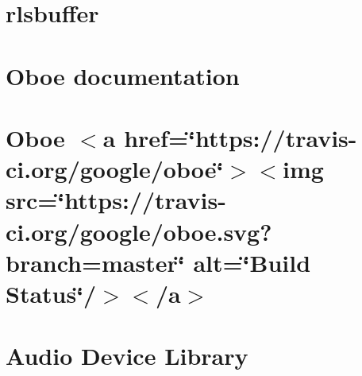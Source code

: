 \let\mypdfximage\pdfximage\def\pdfximage{\immediate\mypdfximage}\documentclass[twoside]{book}
\newcommand{\+}{\discretionary{\mbox{\scriptsize$\hookleftarrow$}}{}{}}
\begin{document}
\chapter{rlsbuffer}
\label{md__c_1__users_fab_src__github_branches__neural_amp_modeler_plugin_i_plug2__dependencies__build_82bff65e223067fac2c8242c8de4c2e0}

\chapter{Oboe documentation}
\label{md__c_1__users_fab_src__github_branches__neural_amp_modeler_plugin_i_plug2__dependencies__build_8429b671cd8213459e74120ebf9f67ac}

\chapter{Oboe $<$a href=\char`\"{}https\+://travis-\/ci.\+org/google/oboe\char`\"{}$>$$<$img src=\char`\"{}https\+://travis-\/ci.\+org/google/oboe.\+svg?branch=master\char`\"{} alt=\char`\"{}\+Build Status\char`\"{}/$>$$<$/a$>$}
\label{md__c_1__users_fab_src__github_branches__neural_amp_modeler_plugin_i_plug2__dependencies__build_a1640862761b0042f094d1f9ea605029}

\chapter{Audio Device Library}
\label{md__c_1__users_fab_src__github_branches__neural_amp_modeler_plugin_i_plug2__dependencies__build_b700caff09b2896a8bd3e69afa45fef1}

\end{document}
